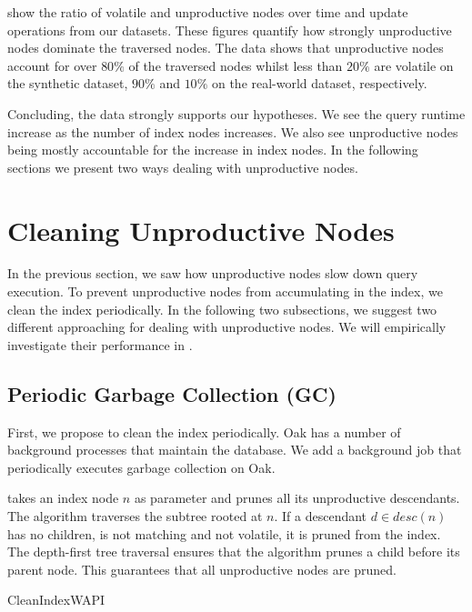\documentclass[abstracton,12pt]{scrartcl}
\theoremstyle{definition}
\begin{document}
show the ratio of volatile and unproductive nodes over time and update
operations from our datasets. These figures quantify how strongly unproductive
nodes dominate the traversed nodes. The data shows that unproductive nodes
account for over $80\%$ of the traversed nodes whilst less than $20\%$ are
volatile on the synthetic dataset, $90\%$ and $10\%$ on the real-world dataset,
respectively.

Concluding, the data strongly supports our hypotheses. We see the query runtime
increase as the number of index nodes increases. We also see unproductive nodes
being mostly accountable for the increase in index nodes. 
In the following sections we present two ways dealing with unproductive nodes.

\newpage

\section{Cleaning Unproductive Nodes}

In the previous section, we saw how unproductive nodes slow down query
execution. To prevent unproductive nodes from accumulating in the index, we
clean the index periodically. In the following two subsections, we suggest two
different approaching for dealing with unproductive nodes. We will empirically
investigate their performance in .

\subsection{Periodic Garbage Collection (GC)}

First, we propose to clean the index periodically.  Oak has a number of background processes that
maintain the database. We add a background job that periodically executes
garbage collection on Oak.

 takes an index node $n$ as parameter and prunes all
its unproductive descendants. The algorithm traverses
the subtree rooted at $n$. If a descendant $d \in desc(n)$ has no children, is
not matching and not
volatile, it is pruned from the index. The depth-first tree traversal ensures
that the algorithm prunes a child before its parent node. This guarantees that
all unproductive nodes are pruned.

\begin{algorithm}
  \caption{CleanIndexWAPI}
  \DontPrintSemicolon
  \label{algo:periodic_gc_wapi}
\end{algorithm}
\end{document}
